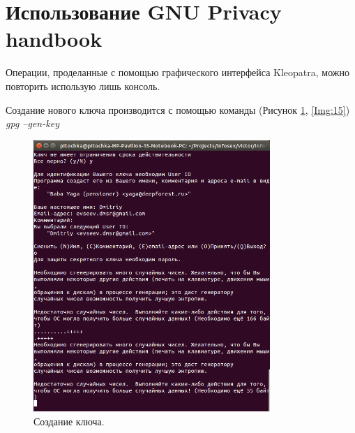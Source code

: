 \documentclass[10pt,a4paper]{report}
\begin{document}
	\section{Использование GNU Privacy handbook}
	Операции, проделанные с помощью графического интерфейса Kleopatra, можно повторить использую лишь консоль.
	
	Создание нового ключа производится с помощью команды (Рисунок \ref{Img:14}, \ref{Img:15}) \textit{gpg --gen-key}
	
	\begin{figure}[h]
		\begin{center}
			\includegraphics[width=0.8\textwidth]{Img/14}
			\caption{Создание ключа.}
			\label{Img:14}
		\end{center}
	\end{figure}
	
\end{document}
